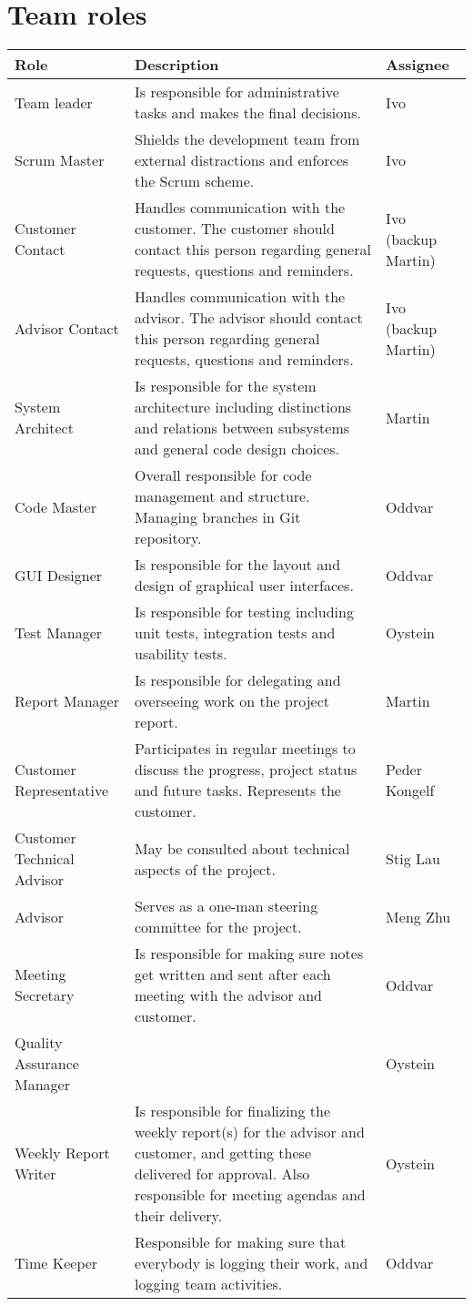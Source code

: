 \section{Team roles}
\begin{tabularx}{\textwidth}{ | l | X | l | }
  \hline
  \textbf{Role} & \textbf{Description} & \textbf{Assignee} \\ 
  \hline
  Team leader & Is responsible for administrative tasks and makes the final decisions. & Ivo \\ 
  \hline
  Scrum Master & Shields the development team from external distractions and enforces the Scrum scheme.  & Ivo \\ 
  \hline
  Customer Contact & Handles communication with the customer. The customer should contact this person regarding general requests, questions and reminders. & Ivo (backup Martin) \\ 
  \hline
  Advisor Contact & Handles communication with the advisor. The advisor should contact this person regarding general requests, questions and reminders.  & Ivo (backup Martin) \\ 
  \hline
  System Architect & Is responsible for the system architecture including distinctions and relations between subsystems and general code design choices. & Martin \\ 
  \hline
  Code Master & Overall responsible for code management and structure. Managing branches in Git repository. & Oddvar  \\ 
  \hline
  GUI Designer & Is responsible for the layout and design of graphical user interfaces. & Oddvar \\ 
  \hline
  Test Manager & Is responsible for testing including unit tests, integration tests and usability tests. & Oystein \\ 
  \hline
  Report Manager & Is responsible for delegating and overseeing work on the project report. & Martin \\ 
  \hline
  Customer Representative & Participates in regular meetings to discuss the progress, project status and future tasks. Represents the customer. & Peder Kongelf \\ 
  \hline
  Customer Technical Advisor & May be consulted about technical aspects of the project. & Stig Lau \\ 
  \hline
  Advisor & Serves as a one-man steering committee for the project. & Meng Zhu \\ 
  \hline
  Meeting Secretary & Is responsible for making sure notes get written and sent after each meeting with the advisor and customer. & Oddvar \\ 
  \hline
  Quality Assurance Manager &  & Oystein \\ 
  \hline
  Weekly Report Writer & Is responsible for finalizing the weekly report(s) for the advisor and customer, and getting these delivered for approval. Also responsible for meeting agendas and their delivery. & Oystein \\ 
  \hline
  Time Keeper & Responsible for making sure that everybody is logging their work, and logging team activities. & Oddvar \\ 
  \hline
\end{tabularx}

